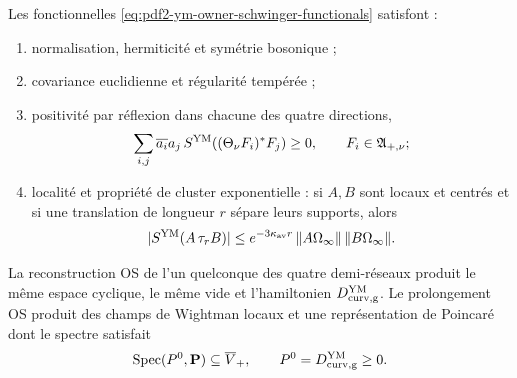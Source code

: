 \begin{proposition}
\label{prop:pdf2-ym-owner-continuum-os-package}
Les fonctionnelles \eqref{eq:pdf2-ym-owner-schwinger-functionals} satisfont :
\begin{enumerate}
 \item normalisation, hermiticité et symétrie bosonique ;
 \item covariance euclidienne et régularité tempérée ;
 \item positivité par réflexion dans chacune des quatre directions,
 \begin{equation}\label{eq:pdf2-ym-owner-continuum-reflection-positive}
  \sum_{i,j}\overline{a_i}a_j\,
  S^{\rm YM}\!\left((\Theta_\nu F_i)^*F_j\right)\ge0,
  \qquad F_i\in\mathfrak A_{+,\nu};
 \end{equation}
 \item localité et propriété de cluster exponentielle : si $A,B$ sont locaux et centrés et si une
 translation de longueur $r$ sépare leurs supports, alors
 \begin{equation}\label{eq:pdf2-ym-owner-continuum-cluster}
  |S^{\rm YM}(A\,\tau_rB)|
  \le e^{-3\kappa_{\rm av}r}\,
       \|A\Omega_\infty\|\,\|B\Omega_\infty\|.
 \end{equation}
\end{enumerate}
La reconstruction OS de l'un quelconque des quatre demi-réseaux produit le même espace cyclique, le même vide et l'hamiltonien $D_{\rm curv,g}^{\rm YM}$. Le prolongement OS produit des champs de Wightman locaux et une représentation de Poincaré dont le spectre satisfait
\begin{equation}\label{eq:pdf2-ym-owner-wightman-spectrum}
 \operatorname{Spec}(P^0,\mathbf P)\subseteq\overline V_+,
 \qquad P^0=D_{\rm curv,g}^{\rm YM}\ge0.
\end{equation}
\end{proposition}

